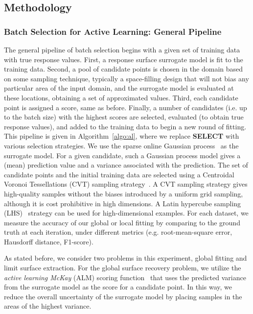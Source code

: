 \subsection{Methodology}
\label{method}

\subsubsection{Batch Selection for Active Learning: General Pipeline}
The general pipeline of batch selection begins with a given set of training data with true response values.
%
First, a response surface surrogate model is fit to the training data.
%
Second, a pool of candidate points is chosen in the domain based on some sampling technique, typically a space-filling design that will not bias any particular area of the input domain, and the surrogate model is evaluated at these locations, obtaining a set of approximated values.
%
Third, each candidate point is assigned a score, same as before.
%
Finally, a number of candidates (i.e. up to the batch size) with the highest scores are selected, evaluated (to obtain true response values), and added to the training data to begin a new round of fitting.
%
This pipeline is given in Algorithm~\ref{algo:al}, where we replace \textbf{SELECT} with various selection strategies.
%
We use the sparse online Gaussian process~\cite{CsatoOpper2002} as the surrogate model.
%
For a given candidate, such a Gaussian process model gives a (mean) prediction value and a variance associated with the prediction.
%
The set of candidate points and the initial training data are selected using a Centroidal Voronoi Tessellations (CVT) sampling strategy~\cite{DuFaberGunzburger1999}.
%
A CVT sampling strategy gives high-quality samples without the biases introduced by a uniform grid sampling, although it is cost prohibitive in high dimensions.
%
A Latin hypercube sampling (LHS)~\cite{ImanDavenportZeigler1980} strategy can be used for high-dimensional examples.
%
For each dataset, we measure the accuracy of our global or local fitting by comparing to the ground truth at each iteration, under different metrics (e.g. root-mean-square error,  Hausdorff distance, F1-score).

As stated before, we consider two problems in this experiment, global fitting and limit surface extraction.
%
For the global surface recovery problem, we utilize the \emph{active learning McKay} (ALM) scoring function~\cite{MacKay1992} that uses the predicted variance from the surrogate model as the score for a candidate point.
%
In this way, we reduce the overall uncertainty of the surrogate model by placing samples in the areas of the highest variance.

